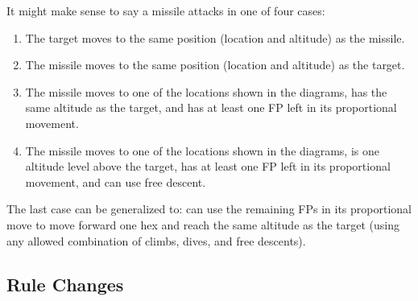 \documentclass[10pt]{report}
\begin{document}
\begin{itemize}
It might make sense to say a missile attacks in one of four cases:
\begin{enumerate}
    \item The target moves to the same position (location and altitude) as the missile.
    \item The missile moves to the same position (location and altitude) as the target.
    \item The missile moves to one of the locations shown in the diagrams, has the same altitude as the target, and has at least one FP left in its proportional movement.
    \item The missile moves to one of the locations shown in the diagrams, is one altitude level above the target, has at least one FP left in its proportional movement, and can use free descent.
\end{enumerate}
The last case can be generalized to: can use the remaining FPs in its proportional move to move forward one hex and reach the same altitude as the target (using any allowed combination of climbs, dives, and free descents).

\end{itemize}

\subsection{Rule Changes}
\end{document}
